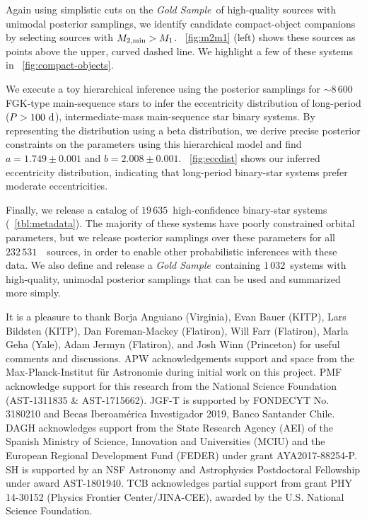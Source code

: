 \documentclass[modern]{aastex63}
\newcommand{\nsources}{\ensuremath{232\,531}}
\newcommand{\nbinary}{\ensuremath{19\,635}}
\newcommand{\goldsample}{\textit{Gold Sample}}
\newcommand{\ngold}{\ensuremath{1\,032}}
\begin{document}
\begin{description}
    Again using simplistic cuts on the \goldsample\ of high-quality sources with
    unimodal posterior samplings, we identify candidate compact-object
    companions by selecting sources with $M_{2, {\rm min}} > M_1$.
    \figurename~\ref{fig:m2m1} (left) shows these sources as points above the
    upper, curved dashed line. We highlight a few of these systems in
    \figurename~\ref{fig:compact-objects}.
    \item[The binary-star eccentricity distribution is peaked at
    moderate eccentricities] We execute a toy hierarchical inference using the
    posterior samplings for $\sim 8\,600$ FGK-type main-sequence stars to infer
    the eccentricity distribution of long-period ($P>100~\mathrm{d}$),
    intermediate-mass main-sequence star binary systems. By representing the
    distribution using a beta distribution, we derive precise posterior
    constraints on the parameters using this hierarchical model and find $a =
    1.749 \pm 0.001$ and $b = 2.008 \pm 0.001$. \figurename~\ref{fig:eccdist}
    shows our inferred eccentricity distribution, indicating that long-period
    binary-star systems prefer moderate eccentricities.
    \item[We release a sample of $20\,000$ binary-star systems and posterior
    samplings over orbital parameters for $\nsources$ \apogee\ sources] Finally,
    we release a catalog of \nbinary\ high-confidence binary-star systems
    (\tablename~\ref{tbl:metadata}). The majority of these systems have poorly
    constrained orbital parameters, but we release posterior samplings over
    these parameters for all \nsources\ \apogee\ sources, in order to enable
    other probabilistic inferences with these data. We also define and release a
    \goldsample\ containing \ngold\ systems with high-quality, unimodal
    posterior samplings that can be used and summarized more simply.
\end{description}


\acknowledgements

It is a pleasure to thank
Borja Anguiano (Virginia),
Evan Bauer (KITP),
Lars Bildsten (KITP),
Dan Foreman-Mackey (Flatiron),
Will Farr (Flatiron),
Marla Geha (Yale),
Adam Jermyn (Flatiron),
and Josh Winn (Princeton) for useful comments and discussions.
APW acknowledgements support and space from the Max-Planck-Institut f\"ur
Astronomie during initial work on this project.
PMF acknowledge support for this research from the National Science Foundation
(AST-1311835 \& AST-1715662).
JGF-T is supported by FONDECYT No. 3180210 and Becas Iberoam\'erica Investigador
2019, Banco Santander Chile.
DAGH acknowledges support from the State Research Agency (AEI) of the Spanish
Ministry of Science, Innovation and Universities (MCIU) and the European
Regional Development Fund (FEDER) under grant AYA2017-88254-P.
SH is supported by an NSF Astronomy and Astrophysics Postdoctoral Fellowship
under award AST-1801940.
TCB acknowledges  partial support from grant PHY 14-30152 (Physics Frontier
Center/JINA-CEE), awarded by the U.S. National Science Foundation.
\end{document}
